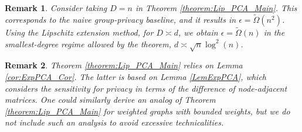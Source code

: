 \documentclass{article}
\newtheorem{remark}{Remark}
\newcommand{\real}{\mathbb{R}}
\begin{document}
\begin{remark}
\label{remark:PCA_D=n}
Consider taking $D = n$ in Theorem \ref{theorem:Lip_PCA_Main}. This corresponds to the naive group-privacy baseline, and it results in $\epsilon = \widetilde{\Omega}(n^2)$. Using the Lipschitz extension method, for $D \asymp d$, we obtain $\epsilon = \widetilde{\Omega}(n)$ in the smallest-degree regime allowed by the theorem, $d \asymp \sqrt{n}\log^2(n)$.
\end{remark}

\begin{remark}
Theorem \ref{theorem:Lip_PCA_Main} relies on Lemma \ref{cor:ExpPCA_Cor}. The latter is based on Lemma \ref{LemExpPCA}, which considers the sensitivity for privacy in terms of the difference of node-adjacent matrices. One could similarly derive an analog of Theorem \ref{theorem:Lip_PCA_Main} for weighted graphs with bounded weights, but we do not include such an analysis to avoid excessive technicalities.
\end{remark}

\end{document}
